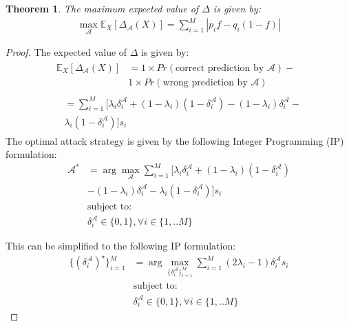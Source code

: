 \documentclass{article}
\newtheorem{theorem}{Theorem}
\begin{document}
\begin{theorem}
The maximum expected value of $\Delta$ is given by:
\begin{align*}
    \max_\mathcal{A}\mathbb{E}_X[\Delta_\mathcal{A}(X)]= \sum_{i=1}^M |p_i f - q_i (1-f)|
\end{align*}
\end{theorem}

\begin{proof}
The expected value of $\Delta$ is given by: 
\begin{align}
\begin{split}
    \mathbb{E}_X[\Delta_\mathcal{A}(X)]&= 1 \times Pr(\text{correct prediction by $\mathcal{A}$}) - \\  &1 \times Pr(\text{wrong prediction by $\mathcal{A}$})
\end{split} \\
    \begin{split}
            &= \sum_{i=1}^M [\lambda_i \delta^\mathcal{A}_i + (1-\lambda_i)(1-\delta^\mathcal{A}_i) - (1-\lambda_i)\delta^\mathcal{A}_i - \\
            &\lambda_i (1-\delta^\mathcal{A}_i)] s_i
    \end{split}
\end{align}
The optimal attack strategy is given by the following Integer Programming (IP) formulation: 
\begin{equation}
\begin{aligned}
       \mathcal{A}^{*} &= \arg \max_{\mathcal{A}} \sum_{i=1}^M [\lambda_i \delta^\mathcal{A}_i + (1-\lambda_i)(1-\delta^\mathcal{A}_i) 
        \\ &- (1-\lambda_i)\delta^\mathcal{A}_i - \lambda_i (1-\delta^\mathcal{A}_i)] s_i \\
    & \text{subject to:} \\
    & \delta^\mathcal{A}_i \in \{0,1\}, \forall i \in \{1,..M\}
\end{aligned}    
\end{equation}

This can be simplified to the following IP formulation: 
\begin{equation}
\begin{aligned}
\{(\delta^\mathcal{A}_i)^{\star}\}_{i=1}^M &= \arg \max_{\{\delta^\mathcal{A}_i\}_{i=1}^M} \sum_{i=1}^M (2 \lambda_i - 1) \delta^\mathcal{A}_i s_i \\
& \text{subject to:} \\
& \delta^\mathcal{A}_i \in \{0,1\}, \forall i \in \{1,..M\}
\end{aligned}
\end{equation}


\end{proof}
\end{document}
